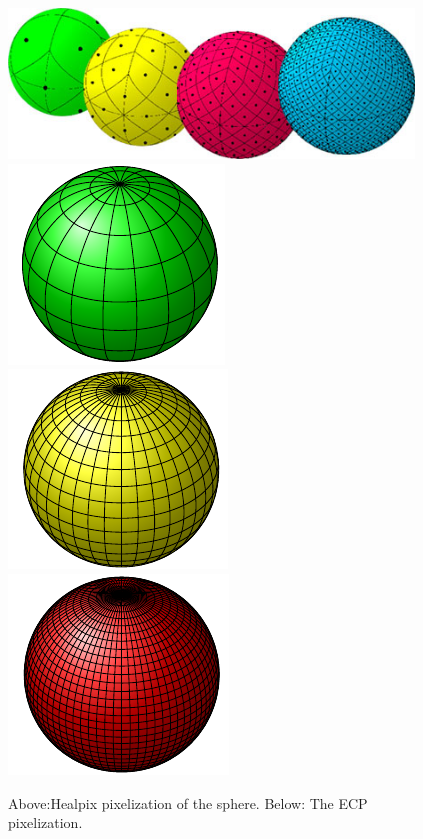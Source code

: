 \documentclass[12pt]{article}
\begin{document}
\begin{figure}[ht]
   \centering
      \includegraphics[height=4cm,width=10.78cm,angle=0]{fig/healpixGridRefinement.jpg} \\
      \includegraphics[]{fig/cylindrical-f1.pdf}
      \includegraphics[]{fig/cylindrical-f2.pdf}
      \includegraphics[]{fig/cylindrical-f3.pdf}
   \caption{Above:Healpix pixelization of the sphere. Below: The ECP pixelization.}
   \label{healpix}
\end{figure}
\end{document}
